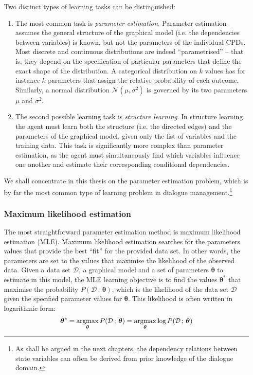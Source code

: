 Two distinct types of learning tasks can be distinguished:
\begin{enumerate}
\item The most common task is \textit{parameter estimation}.  Parameter estimation assumes the general structure of the graphical model (i.e. the dependencies between variables) is known, but not the parameters of the individual CPDs. Most discrete and continuous distributions are indeed ``parametrised'' -- that is, they depend on the specification of particular parameters that define the exact shape of the distribution. A categorical distribution on $k$ values has for instance $k$ parameters that assign the relative probability of each outcome.  Similarly, a normal distribution $\mathcal{N}(\mu,\sigma^2)$ is governed by its two parameters $\mu$ and $\sigma^2$. 

\item The second possible learning task is \textit{structure learning}.  In structure learning, the agent must learn both the structure (i.e. the directed edges) and the parameters of the graphical model, given only the list of variables and the training data.  This task is significantly more complex than parameter estimation, as the agent must simultaneously find which variables influence one another and estimate their corresponding conditional dependencies. 
\end{enumerate}

We shall concentrate in this thesis on the parameter estimation problem, which is by far the most common type of learning problem in dialogue management.\footnote{As shall be argued in the next chapters, the dependency relations between state variables can often be derived from prior knowledge of the dialogue domain.}

\subsubsection*{Maximum likelihood estimation}

The most straightforward parameter estimation method is maximum likelihood estimation (MLE). Maximum likelihood estimation searches for the parameters values that provide the best ``fit'' for the provided data set.  In other words, the parameters are set to the values that maximise the likelihood of the observed data.  Given a data set $\mathcal{D}$, a graphical model and a set of parameters $\boldsymbol\theta$ to estimate in this model, the MLE learning objective is to find the values $\boldsymbol\theta^*$  that maximise the probability $P(\mathcal{D} \, ;  \, \boldsymbol\theta)$, which is the likelihood of the data set $\mathcal{D}$ given the specified parameter values for $\boldsymbol\theta$. This likelihood is often written in logarithmic form: 
\begin{equation}
\boldsymbol\theta^* = \argmax_{\boldsymbol\theta} P(\mathcal{D}  \, ; \, \boldsymbol\theta) = \argmax_{\boldsymbol\theta} \log P(\mathcal{D}  \,  ;  \, \boldsymbol\theta)
\end{equation}


